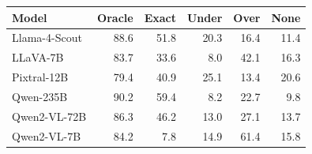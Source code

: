 \begin{tabular}{lrrrrr}
\toprule
Model & Oracle & Exact & Under & Over & None \\
\midrule
Llama-4-Scout & 88.6 & 51.8 & 20.3 & 16.4 & 11.4 \\
LLaVA-7B & 83.7 & 33.6 & 8.0 & 42.1 & 16.3 \\
Pixtral-12B & 79.4 & 40.9 & 25.1 & 13.4 & 20.6 \\
Qwen-235B & 90.2 & 59.4 & 8.2 & 22.7 & 9.8 \\
Qwen2-VL-72B & 86.3 & 46.2 & 13.0 & 27.1 & 13.7 \\
Qwen2-VL-7B & 84.2 & 7.8 & 14.9 & 61.4 & 15.8 \\
\bottomrule
\end{tabular}
